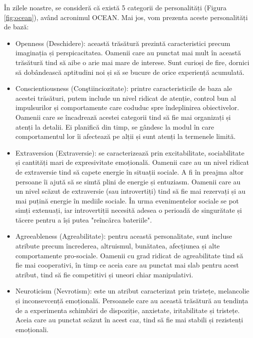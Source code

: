 \documentclass[a4paper, 12pt]{report}
\begin{document}
	În zilele noastre, se consideră că există 5 categorii de personalități (Figura \ref{fig:ocean}), având acronimul OCEAN. Mai jos, vom prezenta aceste personalități de bază:
	\begin{itemize}
		\item Openness (Deschidere): această trăsătură prezintă caracteristici precum imaginația și perspicacitatea. Oamenii care au punctat mai mult în această trăsătură tind să aibe o arie mai mare de interese. Sunt curioși de fire, dornici să dobândească aptitudini noi și să se bucure de orice experiență acumulată.
		
		\item Conscientiousness (Conştiinciozitate): printre caracteristicile de baza ale acestei trăsături, putem include un nivel ridicat de atenție, control bun al impulsurilor și comportamente care coduduc spre îndeplinirea obiectivelor. Oamenii care se încadrează acestei categorii tind să fie mai organizați și atenți la detalii. Ei planifică din timp, se gândesc la modul în care comportamentul lor îi afectează pe alții și sunt atenți la termenele limită.
		
		\item Extraversion (Extraversie): se caracterizează prin excitabilitate, sociabilitate și cantități mari de expresivitate emoțională. Oamenii care au un nivel ridicat de extraversie tind să capete energie în situații sociale. A fi în preajma altor persoane îi ajută să se simtă plini de energie și entuziasm.
		Oamenii care au un nivel scăzut de extraversie (sau introvertiți) tind să fie mai rezervați și au mai puțină energie în mediile sociale. În urma evenimentelor sociale se pot simți extenuați, iar introvertiții necesită adesea o perioadă de singurătate și tăcere pentru a își putea "reîncărca bateriile".
		
		\item Agreeableness (Agreabilitate): pentru această personalitate, sunt incluse atribute precum încrederea, altruismul, bunătatea, afecțiunea și alte comportamente pro-sociale. Oamenii cu grad ridicat de agreabilitate tind să fie mai cooperativi, în timp ce aceia care au punctat mai slab pentru acest atribut, tind să fie competitivi și uneori chiar manipulativi.
		
		\item Neuroticism (Nevrotism): este un atribut caracterizat prin tristețe, melancolie și inconsevcență emoțională. Persoanele care au această trăsătură au tendința de a experimenta schimbări de dispoziție, anxietate, iritabilitate și tristețe. Aceia care au punctat scăzut în acest caz, tind să fie mai stabili și rezistenți emoționali.
	\end{itemize} 
	
\end{document}
